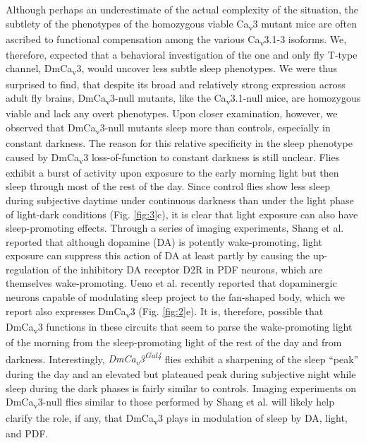 Although perhaps an underestimate of the actual complexity of the situation, the subtlety of the phenotypes of the homozygous viable Ca\textsubscript{v}3 mutant mice are often ascribed to functional compensation among the various Ca\textsubscript{v}3.1-3 isoforms\cite{senatore:2012aa}.
We, therefore, expected that a behavioral investigation of the one and only fly T-type channel, DmCa\textsubscript{v}3, would uncover less subtle sleep phenotypes.
We were thus surprised to find, that despite its broad and relatively strong expression across adult fly brains, DmCa\textsubscript{v}3-null mutants, like the Ca\textsubscript{v}3.1-null mice, are homozygous viable and lack any overt phenotypes.
Upon closer examination, however, we observed that DmCa\textsubscript{v}3-null mutants sleep more than controls, especially in constant darkness.
The reason for this relative specificity in the sleep phenotype caused by DmCa\textsubscript{v}3 loss-of-function to constant darkness is still unclear.
Flies exhibit a burst of activity upon exposure to the early morning light but then sleep through most of the rest of the day.
Since control flies show less sleep during subjective daytime under continuous darkness than under the light phase of light-dark conditions (Fig. \ref{fig:3}c), it is clear that light exposure can also have sleep-promoting effects.
Through a series of imaging experiments, Shang et al. reported that although dopamine (DA) is potently wake-promoting, light exposure can suppress this action of DA at least partly by causing the up-regulation of the inhibitory DA receptor D2R in PDF neurons, which are themselves wake-promoting\cite{shang:2011aa}.
Ueno et al. recently reported that dopaminergic neurons capable of modulating sleep project to the fan-shaped body\cite{ueno:2012aa}, which we report also expresses DmCa\textsubscript{v}3 (Fig. \ref{fig:2}e).
It is, therefore, possible that DmCa\textsubscript{v}3 functions in these circuits that seem to parse the wake-promoting light of the morning from the sleep-promoting light of the rest of the day and from darkness.
Interestingly, \emph{DmCa\textsubscript{v}3\textsuperscript{Gal4}} flies exhibit a sharpening of the sleep ``peak'' during the day and an elevated but plateaued peak during subjective night while sleep during the dark phases is fairly similar to controls.
Imaging experiments on DmCa\textsubscript{v}3-null flies similar to those performed by Shang et al. will likely help clarify the role, if any, that DmCa\textsubscript{v}3 plays in modulation of sleep by DA, light, and PDF. 

